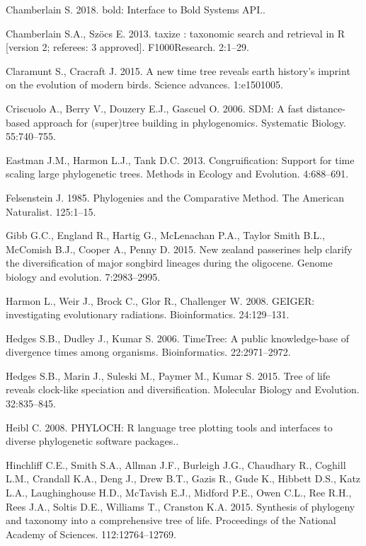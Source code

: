 \documentclass[]{article}
\begin{document}
\leavevmode\hypertarget{ref-Chamberlain2018}{}%
Chamberlain S. 2018. bold: Interface to Bold Systems API..

\leavevmode\hypertarget{ref-Chamberlain2013}{}%
Chamberlain S.A., Szöcs E. 2013. taxize : taxonomic search and retrieval in R {[}version 2; referees: 3 approved{]}. F1000Research. 2:1--29.

\leavevmode\hypertarget{ref-claramunt2015new}{}%
Claramunt S., Cracraft J. 2015. A new time tree reveals earth history's imprint on the evolution of modern birds. Science advances. 1:e1501005.

\leavevmode\hypertarget{ref-Criscuolo2006}{}%
Criscuolo A., Berry V., Douzery E.J., Gascuel O. 2006. SDM: A fast distance-based approach for (super)tree building in phylogenomics. Systematic Biology. 55:740--755.

\leavevmode\hypertarget{ref-Eastman2013}{}%
Eastman J.M., Harmon L.J., Tank D.C. 2013. Congruification: Support for time scaling large phylogenetic trees. Methods in Ecology and Evolution. 4:688--691.

\leavevmode\hypertarget{ref-Felsenstein1985a}{}%
Felsenstein J. 1985. Phylogenies and the Comparative Method. The American Naturalist. 125:1--15.

\leavevmode\hypertarget{ref-gibb2015new}{}%
Gibb G.C., England R., Hartig G., McLenachan P.A., Taylor Smith B.L., McComish B.J., Cooper A., Penny D. 2015. New zealand passerines help clarify the diversification of major songbird lineages during the oligocene. Genome biology and evolution. 7:2983--2995.

\leavevmode\hypertarget{ref-Harmon2008}{}%
Harmon L., Weir J., Brock C., Glor R., Challenger W. 2008. GEIGER: investigating evolutionary radiations. Bioinformatics. 24:129--131.

\leavevmode\hypertarget{ref-Hedges2006}{}%
Hedges S.B., Dudley J., Kumar S. 2006. TimeTree: A public knowledge-base of divergence times among organisms. Bioinformatics. 22:2971--2972.

\leavevmode\hypertarget{ref-Hedges2015}{}%
Hedges S.B., Marin J., Suleski M., Paymer M., Kumar S. 2015. Tree of life reveals clock-like speciation and diversification. Molecular Biology and Evolution. 32:835--845.

\leavevmode\hypertarget{ref-Heibl2008}{}%
Heibl C. 2008. PHYLOCH: R language tree plotting tools and interfaces to diverse phylogenetic software packages..

\leavevmode\hypertarget{ref-Hinchliff2015}{}%
Hinchliff C.E., Smith S.A., Allman J.F., Burleigh J.G., Chaudhary R., Coghill L.M., Crandall K.A., Deng J., Drew B.T., Gazis R., Gude K., Hibbett D.S., Katz L.A., Laughinghouse H.D., McTavish E.J., Midford P.E., Owen C.L., Ree R.H., Rees J.A., Soltis D.E., Williams T., Cranston K.A. 2015. Synthesis of phylogeny and taxonomy into a comprehensive tree of life. Proceedings of the National Academy of Sciences. 112:12764--12769.
\end{document}
